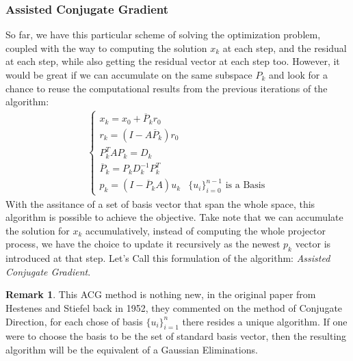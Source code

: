\documentclass[]{article}
\theoremstyle{definition}
\newtheorem{remark}{Remark}[subsection]
\begin{document}
        \subsubsection{Assisted Conjugate Gradient}
            So far, we have this particular scheme of solving the optimization problem, coupled with the way to computing the solution $x_k$ at each step, and the residual at each step, while also getting the residual vector at each step too. However, it would be great if we can accumulate on the same subspace $P_k$ and look for a chance to reuse the computational results from the previous iterations of the algorithm: 
            \begin{align}
                \begin{cases}
                    x_k = x_0 + \overline{P}_k r_0
                    \\
                    r_k = (I - A\overline{P}_k) r_0
                    \\
                    P^T_kAP_k = D_k
                    \\
                    \overline{P}_k = P_kD^{-1}_kP_k^T
                    \\
                    p_k = (I - \overline{P}_kA)u_k & \{u_i\}_{i = 0}^{n - 1} \text{ is a Basis}
                \end{cases}
            \end{align}
            With the assitance of a set of basis vector that span the whole space, this algorithm is possible to achieve the objective. Take note that we can accumulate the solution for $x_k$ accumulatively, instead of computing the whole projector process, we have the choice to update it recursively as the newest $p_k$ vector is introduced at that step. Let's Call this formulation of the algorithm: \textit{Assisted Conjugate Gradient}. 
            \begin{remark}
                This ACG method is nothing new, in the original paper from Hestenes and Stiefel back in 1952, they commented on the method of Conjugate Direction, for each chose of basis $\{u_i\}_{i = 1}^n$ there resides a unique algorithm. If one were to choose the basis to be the set of standard basis vector, then the resulting algorithm will be the equivalent of a Gaussian Eliminations. 
            \end{remark}
\end{document}
